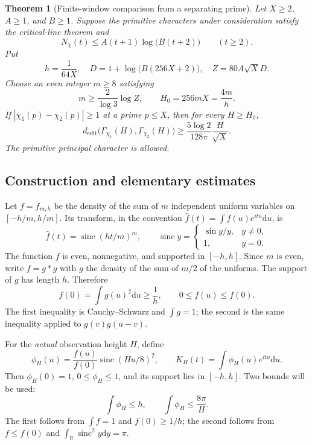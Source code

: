 \documentclass[11pt,letterpaper]{article}
\newtheorem{theorem}{Theorem}[section]
\theoremstyle{definition}\newtheorem{definition}[theorem]{Definition}
\theoremstyle{remark}\newtheorem{remark}[theorem]{Remark}
\newcommand{\sinc}{\operatorname{sinc}}
\newcommand{\dd}{\mathrm{d}}
\newcommand{\edit}{d_{\mathrm{edit}}}
\begin{document}
\begin{theorem}[Finite-window comparison from a separating prime]\label{thm:interface}
Let $X\ge2$, $A\ge1$, and $B\ge1$. Suppose the primitive characters
under consideration satisfy the critical-line theorem and
\begin{equation}\label{eq:count-envelope}
 N_\chi(t)\le A(t+1)\log\bigl(B(t+2)\bigr)\qquad(t\ge2).
\end{equation}
Put
\[
 h=\frac1{64X},\quad D=1+\log\bigl(B(256X+2)\bigr),\quad
 Z=80A\sqrt X D.
\]
Choose an even integer $m\ge8$ satisfying
\begin{equation}\label{eq:mchoice}
 m\ge\frac2{\log3}\log Z,
 \qquad H_0=256mX=\frac{4m}{h}.
\end{equation}
If $|\chi_1(p)-\chi_2(p)|\ge1$ at a prime $p\le X$, then for every
$H\ge H_0$,
\begin{equation}\label{eq:interface-bound}
 \edit\bigl(\Gamma_{\chi_1}(H),\Gamma_{\chi_2}(H)\bigr)
 \ge\frac{5\log2}{128\pi}\frac H{\sqrt X}.
\end{equation}
The primitive principal character is allowed.
\end{theorem}

\subsection{Construction and elementary estimates}

Let $f=f_{m,h}$ be the density of the sum of $m$ independent uniform
variables on $[-h/m,h/m]$. Its transform, in the convention
$\widehat f(t)=\int f(u)e^{itu}\dd u$, is
\[
 \widehat f(t)=\sinc(ht/m)^m,
 \qquad \sinc y=\begin{cases}\sin y/y,&y\ne0,\\1,&y=0.\end{cases}
\]
The function $f$ is even, nonnegative, and supported in $[-h,h]$.
Since $m$ is even, write $f=g*g$ with $g$ the density of the sum of
$m/2$ of the uniforms. The support of $g$ has length $h$. Therefore
\begin{equation}\label{eq:bspline-central}
 f(0)=\int g(u)^2\dd u\ge\frac1h,
 \qquad 0\le f(u)\le f(0).
\end{equation}
The first inequality is Cauchy--Schwarz and $\int g=1$; the second is
the same inequality applied to $g(v)g(u-v)$.

For the \emph{actual} observation height $H$, define
\begin{equation}\label{eq:filter}
 \phi_H(u)=\frac{f(u)}{f(0)}\sinc(Hu/8)^2,
 \qquad K_H(t)=\int\phi_H(u)e^{itu}\dd u.
\end{equation}
Then $\phi_H(0)=1$, $0\le\phi_H\le1$, and its support lies in
$[-h,h]$. Two bounds will be used:
\begin{equation}\label{eq:filter-mass}
 \int\phi_H\le h,\qquad
 \int\phi_H\le\frac{8\pi}{H}.
\end{equation}
The first follows from $\int f=1$ and $f(0)\ge1/h$; the second follows
from $f\le f(0)$ and $\int_{\mathbb R}\sinc^2 y\dd y=\pi$.
\end{document}
